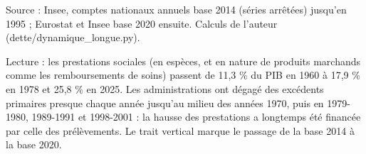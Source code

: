 Source : Insee, comptes nationaux annuels base 2014 (séries arrêtées) jusqu'en 1995 ; Eurostat et Insee base 2020 ensuite. Calculs de l'auteur (dette/dynamique\_longue.py).\par Lecture : les prestations sociales (en espèces, et en nature de produits marchands comme les remboursements de soins) passent de 11,3 \% du PIB en 1960 à 17,9 \% en 1978 et 25,8 \% en 2025. Les administrations ont dégagé des excédents primaires presque chaque année jusqu'au milieu des années 1970, puis en 1979-1980, 1989-1991 et 1998-2001 : la hausse des prestations a longtemps été financée par celle des prélèvements. Le trait vertical marque le passage de la base 2014 à la base 2020.
